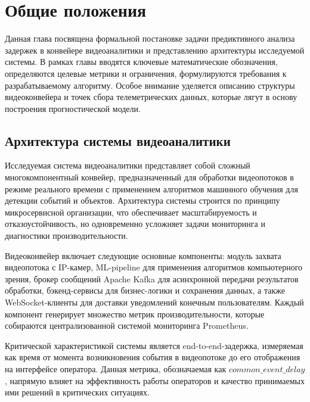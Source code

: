 \chapter{Общие положения}

\hspace*{1.25cm}Данная глава посвящена формальной постановке задачи предиктивного анализа задержек в конвейере видеоаналитики и представлению архитектуры исследуемой системы. В рамках главы вводятся ключевые математические обозначения, определяются целевые метрики и ограничения, формулируются требования к разрабатываемому алгоритму. Особое внимание уделяется описанию структуры видеоконвейера и точек сбора телеметрических данных, которые лягут в основу построения прогностической модели.

\section{Архитектура системы видеоаналитики}

\hspace*{1.25cm}Исследуемая система видеоаналитики представляет собой сложный многокомпонентный конвейер, предназначенный для обработки видеопотоков в режиме реального времени с применением алгоритмов машинного обучения для детекции событий и объектов. Архитектура системы строится по принципу микросервисной организации, что обеспечивает масштабируемость и отказоустойчивость, но одновременно усложняет задачи мониторинга и диагностики производительности.

\hspace*{1.25cm}Видеоконвейер включает следующие основные компоненты: модуль захвата видеопотока с IP-камер, ML-pipeline для применения алгоритмов компьютерного зрения, брокер сообщений Apache Kafka для асинхронной передачи результатов обработки, бэкенд-сервисы для бизнес-логики и сохранения данных, а также WebSocket-клиенты для доставки уведомлений конечным пользователям. Каждый компонент генерирует множество метрик производительности, которые собираются централизованной системой мониторинга Prometheus.

\hspace*{1.25cm}Критической характеристикой системы является end-to-end-задержка, измеряемая как время от момента возникновения события в видеопотоке до его отображения на интерфейсе оператора. Данная метрика, обозначаемая как $common\_event\_delay$, напрямую влияет на эффективность работы операторов и качество принимаемых ими решений в критических ситуациях.

